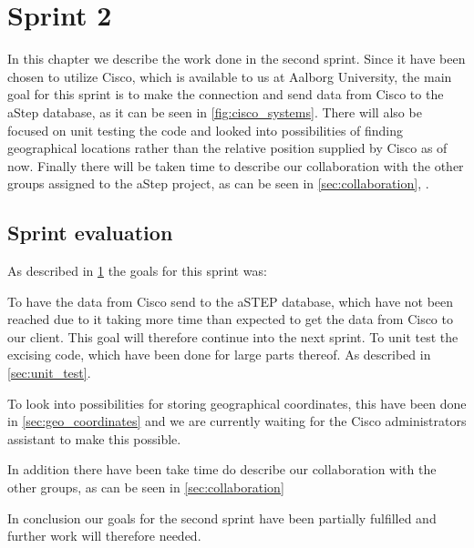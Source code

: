 \chapter{Sprint 2} \label{cha:sprint2}
In this chapter we describe the work done in the second sprint. Since it have been chosen to utilize Cisco, which is available to us at Aalborg University, the main goal for this sprint is to make the connection and send data from Cisco to the aStep database, as it can be seen in \cref{fig:cisco_systems}. There will also be focused on unit testing the code and looked into possibilities of finding geographical locations rather than the relative position supplied by Cisco as of now. Finally there will be taken time to describe our collaboration with the other groups assigned to the aStep project, as can be seen in \cref{sec:collaboration}, .






\section{Sprint evaluation}
As described in \cref{cha:sprint2} the goals for this sprint was: 

To have the data from Cisco send to the aSTEP database, which have not been reached due to it taking more time than expected to get the data from Cisco to our client. This goal will therefore continue into the next sprint.
To unit test the excising code, which have been done for large parts thereof. As described in \cref{sec:unit_test}.

To look into possibilities for storing geographical coordinates, this have been done in \cref{sec:geo_coordinates} and we are currently waiting for the Cisco administrators assistant to make this possible.

In addition there have been take time do describe our collaboration with the other groups, as can be seen in \cref{sec:collaboration} 

In conclusion our goals for the second sprint have been partially fulfilled and further work will therefore needed.
